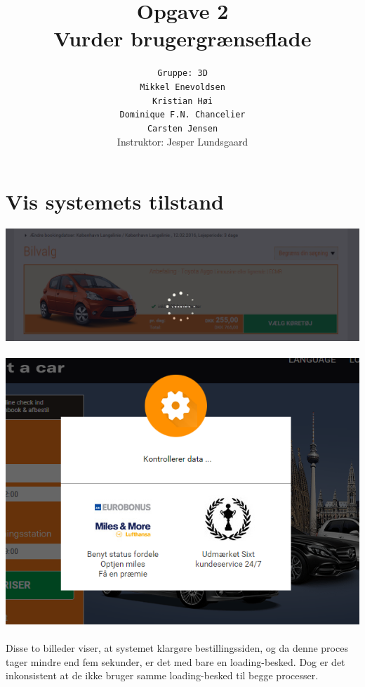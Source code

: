 \documentclass[12pt]{article}
\author{
  \texttt{Gruppe: 3D} \\
  \texttt{Mikkel Enevoldsen} \\[.4cm]
  \texttt{Kristian Høi} \\[.4cm]
  \texttt{Dominique F.N. Chancelier} \\[.4cm]
  \texttt{Carsten Jensen} \\[.4cm]
  Instruktor: Jesper Lundsgaard
  \vspace{8cm}
}
\title{
  \vspace{3cm}
  \Huge{Opgave 2} \\[.25cm]
  \large{Vurder brugergrænseflade}
  \vspace{.75cm}
}
\begin{document}
\clearpage\maketitle
\thispagestyle{empty}

\newpage


\thispagestyle{empty}

\pagestyle{plain}
\setcounter{page}{1}

\section{Vis systemets tilstand}
\includegraphics[scale=0.5]{img/Sixt_Loading}
\\
\\

\includegraphics[scale=0.8]{img/Kontrollerer_Data}
\\
\\
Disse to billeder viser, at systemet klargøre bestillingssiden, og da denne proces tager mindre end fem sekunder, er det med bare en loading-besked. Dog er det inkonsistent at de ikke bruger samme loading-besked til begge processer.
\end{document}
